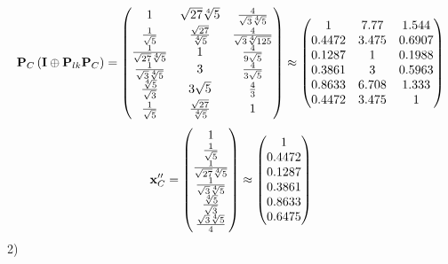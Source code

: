 \documentclass[10pt,a4paper]{article}
\begin{document}
	\[
		\bold{P}_{C}\left(\bold{I} \oplus \bold{P}_{lk}\bold{P}_{C}\right) = 
		\begin{pmatrix}
			{1} {} & {\sqrt{27}\sqrt[4]{5}} {} & \frac{{4}} {\sqrt{3}\sqrt[4]{5}} \\
			\frac{1} {\sqrt{5}} & \frac{\sqrt{27}} {\sqrt[4]{5}} & \frac{{4}} {\sqrt{3}\sqrt[4]{125}} \\
			\frac{1} {\sqrt{27}\sqrt[4]{5}} & {1} {} & \frac{{4}} {{9}\sqrt{5}} \\
			\frac{1} {\sqrt{3}\sqrt[4]{5}} & {{3}} {} & \frac{{4}} {{3}\sqrt{5}} \\
			\frac{\sqrt[4]{5}} {\sqrt{3}} & {{3}\sqrt{5}} {} & \frac{{4}} {{3}} \\
			\frac{1} {\sqrt{5}} & \frac{\sqrt{27}} {\sqrt[4]{5}} & {1} {} \\
		\end{pmatrix}
		\approx
		\begin{pmatrix}
			1        & 7.77     & 1.544    \\
			0.4472   & 3.475    & 0.6907   \\
			0.1287   & 1        & 0.1988   \\
			0.3861   & 3        & 0.5963   \\
			0.8633   & 6.708    & 1.333    \\
			0.4472   & 3.475    & 1        \\
		\end{pmatrix}
	\]
	\[
		\bold{x}''_{C} = 
		\begin{pmatrix}
			{1} {} \\
			\frac{1} {\sqrt{5}} \\
			\frac{1} {\sqrt{27}\sqrt[4]{5}} \\
			\frac{1} {\sqrt{3}\sqrt[4]{5}} \\
			\frac{\sqrt[4]{5}} {\sqrt{3}} \\
			\frac{\sqrt{3}\sqrt[4]{5}} {{4}} \\
		\end{pmatrix}
		\approx
		\begin{pmatrix}
			1        \\
			0.4472   \\
			0.1287   \\
			0.3861   \\
			0.8633   \\
			0.6475   \\
		\end{pmatrix}
	\]
	2)
\end{document}
